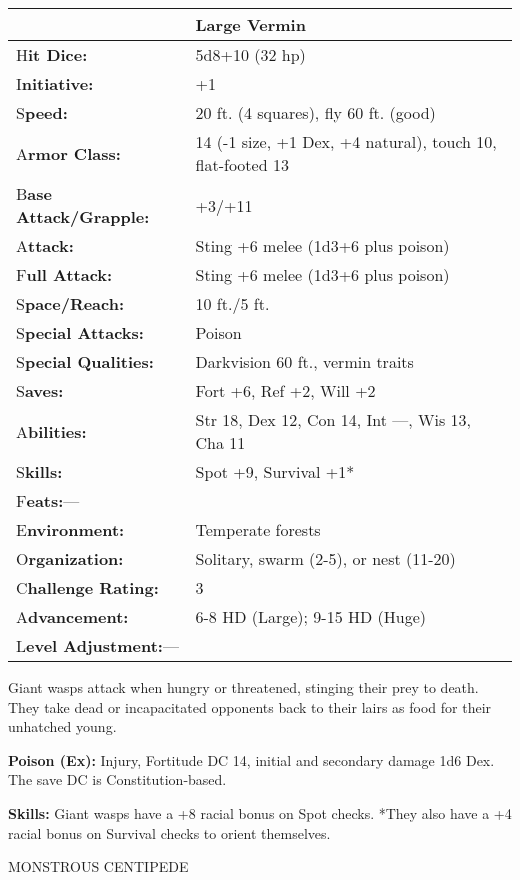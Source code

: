 \documentclass{article}
\begin{document}
\begin{tabular}{|>{\raggedright}p{91pt}|>{\raggedright}p{226pt}|}
\hline
  & Large Vermin\tabularnewline
\hline
H\textbf{it Dice:} & 5d8+10 (32 hp)\tabularnewline
\hline
I\textbf{nitiative:} & +1\tabularnewline
\hline
S\textbf{peed:} & 20 ft. (4 squares), fly 60 ft. (good)\tabularnewline
\hline
A\textbf{rmor Class:} & 14 (-1 size, +1 Dex, +4 natural), touch 10, flat-footed 
13\tabularnewline
\hline
B\textbf{ase Attack/Grapple:} & +3/+11\tabularnewline
\hline
A\textbf{ttack:} & Sting +6 melee (1d3+6 plus poison)\tabularnewline
\hline
F\textbf{ull Attack:} & Sting +6 melee (1d3+6 plus poison)\tabularnewline
\hline
S\textbf{pace/Reach:} & 10 ft./5 ft.\tabularnewline
\hline
S\textbf{pecial Attacks:} & Poison\tabularnewline
\hline
S\textbf{pecial Qualities:} & Darkvision 60 ft., vermin traits\tabularnewline
\hline
S\textbf{aves:} & Fort +6, Ref +2, Will +2\tabularnewline
\hline
A\textbf{bilities:} & Str 18, Dex 12, Con 14, Int ---, Wis 13, Cha 11\tabularnewline
\hline
S\textbf{kills:} & Spot +9, Survival +1*\tabularnewline
\hline
F\textbf{eats:}--- & \tabularnewline
\hline
E\textbf{nvironment:} & Temperate forests\tabularnewline
\hline
O\textbf{rganization:} & Solitary, swarm (2-5), or nest (11-20)\tabularnewline
\hline
C\textbf{hallenge Rating:} & 3\tabularnewline
\hline
A\textbf{dvancement:} & 6-8 HD (Large); 9-15 HD (Huge)\tabularnewline
\hline
L\textbf{evel Adjustment:}--- & \tabularnewline
\hline
\end{tabular}

Giant wasps attack when hungry or threatened, stinging their prey to death. They 
take dead or incapacitated opponents back to their lairs as food for their unhatched 
young.

\textbf{Poison (Ex): }Injury, Fortitude DC 14, initial and secondary damage 1d6 
Dex. The save DC is Constitution-based.

\textbf{Skills:} Giant wasps have a +8 racial bonus on Spot checks. *They also 
have a +4 racial bonus on Survival checks to orient themselves.

\vspace{12pt}
MONSTROUS CENTIPEDE
\end{document}

